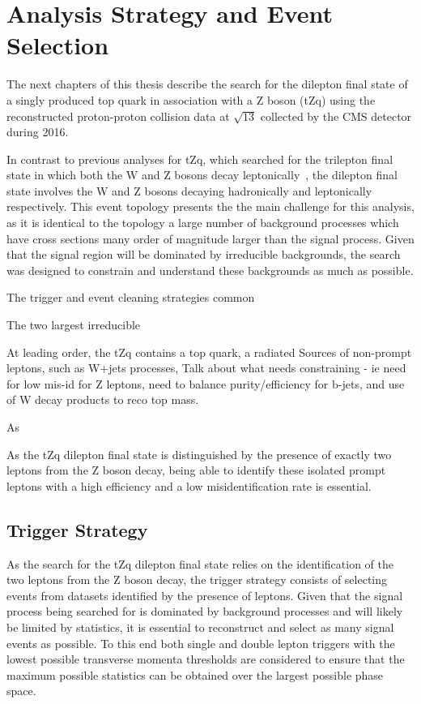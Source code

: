 \chapter{Analysis Strategy and Event Selection}\label{chapter:tzq-search}
The next chapters of this thesis describe the search for the dilepton final state of a singly produced top quark in association with a Z boson (tZq) using the reconstructed proton-proton collision data at $\sqrt{13}$ collected by the CMS detector during 2016.

In contrast to previous analyses for tZq, which searched for the trilepton final state in which both the W and Z bosons decay leptonically~\cite{Sirunyan:2017kkr,Sirunyan:2017nbr}, the dilepton final state involves the W and Z bosons decaying hadronically and leptonically respectively.
This event topology presents the the main challenge for this analysis, as it is identical to the topology a large number of background processes which have cross sections many order of magnitude larger than the signal process.
Given that the signal region will be dominated by irreducible backgrounds, the search was designed to constrain and understand these backgrounds as much as possible.
	
The trigger and event cleaning strategies common


The two largest irreducible 


At leading order, the tZq contains a top quark, a radiated 
Sources of non-prompt leptons, such as W+jets processes, 
Talk about what needs constraining - ie need for low mis-id for Z leptons, need to balance purity/efficiency for b-jets, and use of W decay products to reco top mass.


As 


As the tZq dilepton final state is distinguished by the presence of exactly two leptons from the Z boson decay, being able to identify these isolated prompt leptons with a high efficiency and a low misidentification rate is essential.



\section{Trigger Strategy}\label{sec:triggerStrategy}
As the search for the tZq dilepton final state relies on the identification of the two leptons from the Z boson decay, the trigger strategy consists of selecting events from datasets identified by the presence of leptons.
Given that the signal process being searched for is dominated by background processes and will likely be limited by statistics, it is essential to reconstruct and select as many signal events as possible.
To this end both single and double lepton triggers with the lowest possible transverse momenta thresholds are considered 
to ensure that the maximum possible statistics can be obtained over the largest possible phase space.

